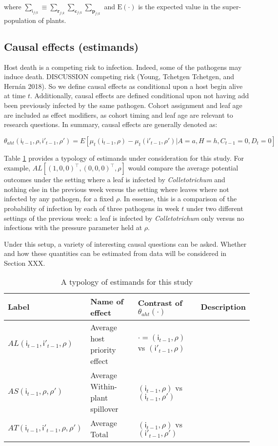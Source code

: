 \documentclass[]{article}
\begin{document}
where
\(\sum_{\mathsf{i}_{j \setminus k}} \equiv \sum_{\mathbf{r}_{j \setminus k}} \sum_{\mathbf{c}_{j \setminus k}} \sum_{\mathbf{p}_{j \setminus k}}\)
and \(\mathrm{E}(\cdot)\) is the expected value in the super-population
of plants.

\subsection{Causal effects (estimands)}\label{estimands}

Host death is a competing risk to infection. Indeed, some of the
pathogens may induce death. DISCUSSION competing risk (Young, Tchetgen
Tchetgen, and Hernán 2018). So we define causal effects as conditional
upon a host begin alive at time \(t\). Additionally, causal effects are
defined conditional upon not having add been previously infected by the
same pathogen. Cohort assignment and leaf age are included as effect
modifiers, as cohort timing and leaf age are relevant to research
questions. In summary, causal effects are generally denoted as:

\[
\theta_{aht}(\mathsf{i}_{t-1}, \rho, \mathsf{i}'_{t-1}, \rho') = E[\mu_{t}(\mathsf{i}_{t-1}, \rho) - \mu_{t}(\mathsf{i}'_{t-1}, \rho') |  A = a, H = h, C_{t-1} = 0, D_t = 0]
\]

Table \ref{tab:estimands} provides a typology of estimands under
consideration for this study. For example,
\(AL[(1, 0, 0)^{\intercal}, (0, 0, 0)^{\intercal}, \rho]\) would compare
the average potential outcomes under the setting where a leaf is
infected by \emph{Colletotrichum} and nothing else in the previous week
versus the setting where leaves where not infected by any pathogen, for
a fixed \(\rho\). In essense, this is a comparison of the probability of
infection by each of three pathogens in week \(t\) under two different
settings of the previous week: a leaf is infected by
\emph{Colletotrichum} only versus no infections with the pressure
parameter held at \(\rho\).

Under this setup, a variety of interesting causal questions can be
asked. Whether and how these quantities can be estimated from data will
be considered in Section XXX.

\begin{table}[H]
\caption{A typology of estimands for this study}
\label{tab:estimands}
\begin{tabular}{llll}
Label & Name of effect & Contrast of $\theta_{aht}(\cdot)$ & Description \\
\hline
$AL(\mathsf{i}_{t-1}, \mathsf{i}'_{t-1}, \rho)$ & Average host priority effect &  $\cdot = (\mathsf{i}_{t-1}, \rho)$ vs $(\mathsf{i}'_{t-1}, \rho)$ & \\
$AS(\mathsf{i}_{t-1}, \rho, \rho')$ & Average Within-plant spillover & $(\mathsf{i}_{t-1}, \rho)$ vs $(\mathsf{i}_{t-1}, \rho')$ & \\
$AT(\mathsf{i}_{t-1}, \mathsf{i}'_{t-1}, \rho, \rho')$  & Average Total & $(\mathsf{i}_{t-1}, \rho)$ vs $(\mathsf{i}'_{t-1}, \rho')$ & \\
\end{tabular}
\end{table}
\end{document}
